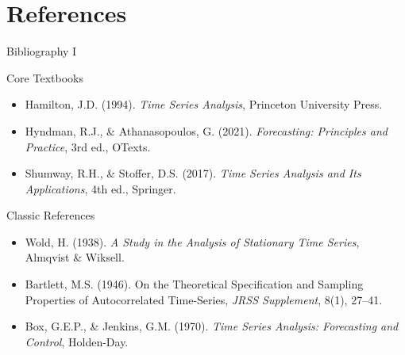 \documentclass[9pt, aspectratio=169, t]{beamer}
\begin{document}
\section{References}

\begin{frame}{Bibliography I}
    \begin{block}{Core Textbooks}
        {\small
        \begin{itemize}\setlength{\itemsep}{0pt}
            \item Hamilton, J.D. (1994). \textit{Time Series Analysis}, Princeton University Press.
            \item Hyndman, R.J., \& Athanasopoulos, G. (2021). \textit{Forecasting: Principles and Practice}, 3rd ed., OTexts.
            \item Shumway, R.H., \& Stoffer, D.S. (2017). \textit{Time Series Analysis and Its Applications}, 4th ed., Springer.
        \end{itemize}
        }
    \end{block}

    \begin{exampleblock}{Classic References}
        {\small
        \begin{itemize}\setlength{\itemsep}{0pt}
            \item Wold, H. (1938). \textit{A Study in the Analysis of Stationary Time Series}, Almqvist \& Wiksell.
            \item Bartlett, M.S. (1946). On the Theoretical Specification and Sampling Properties of Autocorrelated Time-Series, \textit{JRSS Supplement}, 8(1), 27--41.
            \item Box, G.E.P., \& Jenkins, G.M. (1970). \textit{Time Series Analysis: Forecasting and Control}, Holden-Day.
        \end{itemize}
        }
    \end{exampleblock}
\end{frame}
\end{document}
